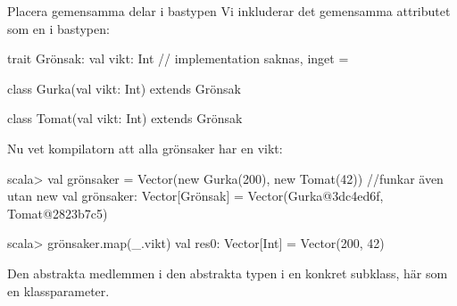 \begin{Slide}{Placera gemensamma delar i bastypen}
\SlideFontSmall
Vi inkluderar det gemensamma attributet  som en  i bastypen:

\begin{Code}
trait Grönsak:
  val vikt: Int    // implementation saknas, inget =

class Gurka(val vikt: Int) extends Grönsak

class Tomat(val vikt: Int) extends Grönsak
\end{Code}
Nu vet kompilatorn att alla grönsaker har en vikt:
\begin{REPLsmall}
scala> val grönsaker = Vector(new Gurka(200), new Tomat(42))   //funkar även utan new
val grönsaker: Vector[Grönsak] =
  Vector(Gurka@3dc4ed6f, Tomat@2823b7c5)

scala> grönsaker.map(_.vikt)
val res0: Vector[Int] = Vector(200, 42)
\end{REPLsmall}
Den abstrakta medlemmen  i den abstrakta typen   i en konkret subklass, här som en klassparameter.

\end{Slide}





